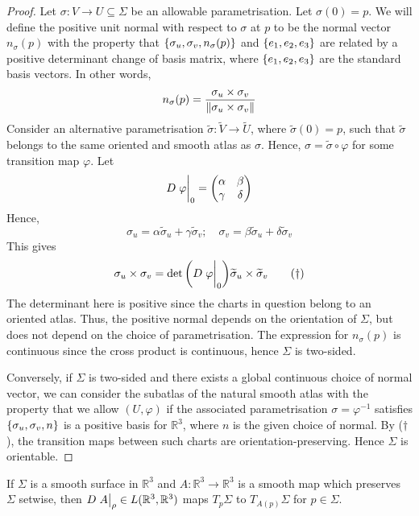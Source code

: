 \begin{proof}
	Let \( \sigma \colon V \to U \subseteq \Sigma \) be an allowable parametrisation.
	Let \( \sigma(0) = p \).
	We will define the positive unit normal with respect to \( \sigma \) at \( p \) to be the normal vector \( n_\sigma(p) \) with the property that \( \qty{\sigma_u, \sigma_v, n_\sigma(p)} \) and \( \qty{e_1, e_2, e_3} \) are related by a positive determinant change of basis matrix, where \( \qty{e_1, e_2, e_3} \) are the standard basis vectors.
	In other words,
	\[
		n_\sigma(p) = \frac{\sigma_u \times \sigma_v}{\norm{\sigma_u \times \sigma_v}}
	\]
	Consider an alternative parametrisation \( \widetilde \sigma \colon \widetilde V \to \widetilde U \), where \( \widetilde \sigma(0) = p \), such that \( \widetilde \sigma \) belongs to the same oriented and smooth atlas as \( \sigma \).
	Hence, \( \sigma = \widetilde \sigma \circ \varphi \) for some transition map \( \varphi \).
	Let
	\[
		D \eval{\varphi}_0 = \begin{pmatrix}
			\alpha & \beta  \\
			\gamma & \delta
		\end{pmatrix}
	\]
	Hence,
	\[
		\sigma_u = \alpha \widetilde \sigma_u + \gamma \widetilde \sigma_v;\quad \sigma_v = \beta \widetilde \sigma_u + \delta \widetilde \sigma_v
	\]
	This gives
	\begin{equation}
		\sigma_u \times \sigma_v = \det\qty(D \eval{\varphi}_0) \widetilde \sigma_u \times \widetilde \sigma_v \tag{\(\dagger\)}
	\end{equation}
	The determinant here is positive since the charts in question belong to an oriented atlas.
	Thus, the positive normal depends on the orientation of \( \Sigma \), but does not depend on the choice of parametrisation.
	The expression for \( n_\sigma(p) \) is continuous since the cross product is continuous, hence \( \Sigma \) is two-sided.

	Conversely, if \( \Sigma \) is two-sided and there exists a global continuous choice of normal vector, we can consider the subatlas of the natural smooth atlas with the property that we allow \( (U,\varphi) \) if the associated parametrisation \( \sigma = \varphi^{-1} \) satisfies \( \qty{\sigma_u, \sigma_v, n} \) is a positive basis for \( \mathbb R^3 \), where \( n \) is the given choice of normal.
	By (\(\dagger\)), the transition maps between such charts are orientation-preserving.
	Hence \( \Sigma \) is orientable.
\end{proof}
\begin{lemma}
	If \( \Sigma \) is a smooth surface in \( \mathbb R^3 \) and \( A \colon \mathbb R^3 \to \mathbb R^3 \) is a smooth map which preserves \( \Sigma \) setwise, then \( D\eval{A}_\rho \in L(\mathbb R^3, \mathbb R^3) \) maps \( T_p \Sigma \) to \( T_{A(p)} \Sigma \) for \( p \in \Sigma \).
\end{lemma}
